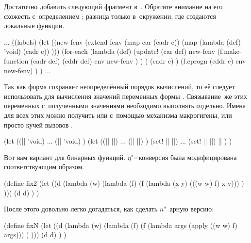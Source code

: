 
Достаточно добавить следующий фрагмент в~. Обратите внимание на
его схожесть с~определением ; разница только в~окружении, где создаются
локальные функции.

\begin{code:lisp}
...
((labels)
 (let ((new-fenv (extend fenv
                         (map car (cadr e))
                         (map (lambda (def) 'void) (cadr e)) )))
   (for-each (lambda (def)
               (update! (car def)
                        new-fenv
                        (f.make-function (cadr def) (cddr def)
                                         env new-fenv ) ) )
             (cadr e) )
   (f.eprogn (cddr e) env new-fenv) ) )
...
\end{code:lisp}



Так как форма  сохраняет неопределённый порядок вычислений, то её
следует использовать для вычисления значений переменных формы .
Связывание~же этих переменных с~полученными значениями необходимо выполнять
отдельно. Имена для всех этих  можно получить или с~помощью
механизма макрогигены, или просто кучей вызовов .

\begin{code:lisp}
(let ((|| 'void)
      ...
      (|| 'void) )
  (let ((|| ||)
        ...
        (|| ||) )
    (set! || ||)
    ...
    (set! || ||)
    || ) )
\end{code:lisp}



Вот вам вариант для бинарных функций. $\eta$"=конверсия была модифицирована
соответствующим образом.

\begin{code:lisp}
(define fix2
  (let ((d (lambda (w)
             (lambda (f)
               (f (lambda (x y) (((w w) f) x y))) ) )))
    (d d) ) )
\end{code:lisp}

\noindent
После этого довольно легко догадаться, как сделать $n$"~арную версию:

\begin{code:lisp}
(define fixN
  (let ((d (lambda (w)
             (lambda (f)
               (f (lambda args (apply ((w w) f) args))) ) )))
    (d d) ) )
\end{code:lisp}


